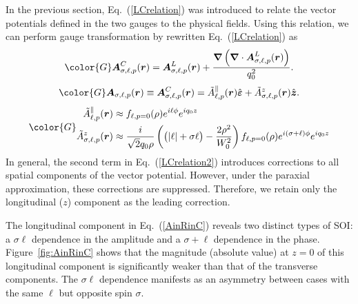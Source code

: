 In the previous section, Eq.~(\ref{LCrelation}) was introduced to relate the vector potentials defined in the two gauges to the physical fields. Using this relation, we can perform gauge transformation by rewritten Eq.~(\ref{LCrelation}) as
\begin{equation}
\color{G}
\boldsymbol{A}^{C}_{\sigma, \ell, p}(\boldsymbol{r})
=
\boldsymbol{A}^{L}_{\sigma, \ell, p}(\boldsymbol{r})
+
\frac{\boldsymbol{\nabla}
\left(
\boldsymbol{\nabla}\cdot
\boldsymbol{A}^{L}_{\sigma, \ell, p}(\boldsymbol{r})
\right)}
{q_0^2}.
\label{LCrelation2}
\end{equation}
\begin{equation}
\color{G}
\boldsymbol{A}_{\sigma, \ell, p}(\boldsymbol{r})
\equiv 
\boldsymbol{A}^{C}_{\sigma, \ell, p}(\boldsymbol{r})
=\tilde{A}^{\parallel}_{\ell, p}(\boldsymbol{r}) \hat{\boldsymbol{\varepsilon}} + \tilde{A}^{z}_{\sigma, \ell, p}(\boldsymbol{r}) \hat{\boldsymbol{z}}.
\end{equation}
\begin{equation} 
\color{G}
\begin{aligned}
\tilde{A}^{\parallel}_{\ell, p}(\boldsymbol{r})
&\approx 
f_{\ell,p=0}(\rho)e^{i\ell \phi}e^{i q_0 z}\\
\tilde{A}^{z}_{\sigma, \ell, p}(\boldsymbol{r})
&\approx
\frac{i}{\sqrt{2}q_0\rho}
\left(
\bigl(|\ell|+\sigma \ell\bigr)-\frac{2\rho^2}{W_0^2}
\right)
f_{\ell,p=0}(\rho)
e^{i(\sigma+\ell)\phi}e^{i q_0 z}
\end{aligned}
\label{AinRinC} %
\end{equation}
In general, the second term in Eq.~(\ref{LCrelation2}) introduces corrections to all spatial components of the vector potential. However, under the paraxial approximation, these corrections are suppressed. Therefore, we retain only the longitudinal ($z$) component as the leading correction.

The longitudinal component in Eq.~(\ref{AinRinC}) reveals two distinct types of SOI: a $\sigma\ell$ dependence in the amplitude and a $\sigma+\ell$ dependence in the phase. Figure~\ref{fig:AinRinC} shows that the magnitude (absolute value) at $z=0$ of this longitudinal component is significantly weaker than that of the transverse components. The $\sigma\ell$ dependence manifests as an asymmetry between cases with the same $\ell$ but opposite spin $\sigma$.


